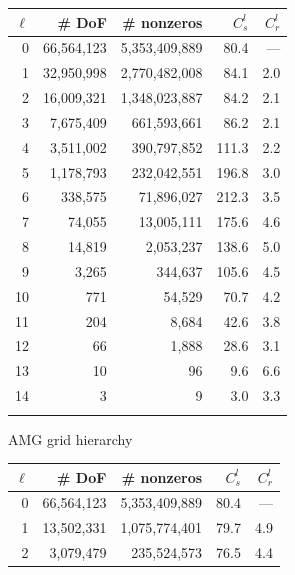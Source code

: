 \begin{figure} [htbp]
  \begin{subfigure}[t]{0.48\textwidth}
    \centering
    \footnotesize
    \begin{tabular}{rrrrr}
      \hline\noalign{\smallskip}
      $\ell$ & \# DoF & \# nonzeros & $C_s^l$ & $C_r^l$ \\
      \hline\noalign{\smallskip}
		   0 & 66,564,123 & 5,353,409,889 &  80.4 & --- \\
		   1 & 32,950,998 & 2,770,482,008 &  84.1 & 2.0 \\
		   2 & 16,009,321 & 1,348,023,887 &  84.2 & 2.1 \\
		   3 &  7,675,409 &   661,593,661 &  86.2 & 2.1 \\
		   4 &  3,511,002 &   390,797,852 & 111.3 & 2.2 \\
		   5 &  1,178,793 &   232,042,551 & 196.8 & 3.0 \\
		   6 &    338,575 &    71,896,027 & 212.3 & 3.5 \\
		   7 &     74,055 &    13,005,111 & 175.6 & 4.6 \\
		   8 &     14,819 &     2,053,237 & 138.6 & 5.0 \\
		   9 &      3,265 &       344,637 & 105.6 & 4.5 \\
		  10 &        771 &        54,529 &  70.7 & 4.2 \\
		  11 &        204 &         8,684 &  42.6 & 3.8 \\
		  12 &         66 &         1,888 &  28.6 & 3.1 \\
		  13 &         10 &            96 &   9.6 & 6.6 \\
		  14 &          3 &             9 &   3.0 & 3.3 \\
      \hline\noalign{\smallskip}
    \end{tabular}
    \caption{AMG grid hierarchy}
  \end{subfigure}
  \hfill
  \begin{subfigure}[t]{0.48\textwidth}
    \centering
    \footnotesize
    \begin{tabular}{rrrrr}
      \hline\noalign{\smallskip}
      $\ell$ & \# DoF & \# nonzeros & $C_s^l$ & $C_r^l$ \\
      \hline\noalign{\smallskip}
			0 & 66,564,123 & 5,353,409,889 & 80.4 &  --- \\
			1 & 13,502,331 & 1,075,774,401 & 79.7 &  4.9 \\
			2 &  3,079,479 &   235,524,573 & 76.5 &  4.4 \\

\end{tabular}
\end{subfigure}
\end{figure}

